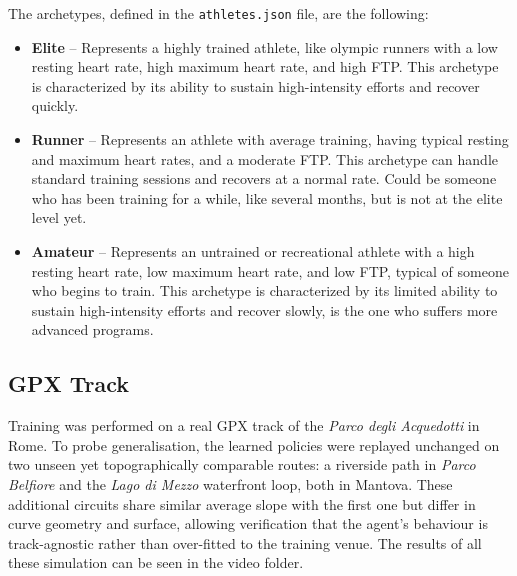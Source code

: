 The archetypes, defined in the \texttt{athletes.json} file, are the following:
\begin{itemize}
  \item \textbf{Elite} – Represents a highly trained athlete, like olympic runners with a low resting heart rate, high maximum heart rate, and high FTP. This archetype is characterized by its ability to sustain high-intensity efforts and recover quickly.
  \item \textbf{Runner} – Represents an athlete with average training, having typical resting and maximum heart rates, and a moderate FTP. This archetype can handle standard training sessions and recovers at a normal rate. Could be someone who has been training for a while, like several months, but is not at the elite level yet.
  \item \textbf{Amateur} – Represents an untrained or recreational athlete with a high resting heart rate, low maximum heart rate, and low FTP, typical of someone who begins to train. This archetype is characterized by its limited ability to sustain high-intensity efforts and recover slowly, is the one who suffers more advanced programs.
\end{itemize}

\subsection{GPX Track}\label{sec:gpx-track}
Training was performed on a real GPX track of the \textit{Parco degli Acquedotti} in Rome. To probe generalisation, the learned policies were replayed unchanged on two unseen yet topographically comparable routes: a riverside path in \textit{Parco Belfiore} and the \textit{Lago di Mezzo} waterfront loop, both in Mantova. These additional circuits share similar average slope with the first one but differ in curve geometry and surface, allowing verification that the agent’s behaviour is track-agnostic rather than over-fitted to the training venue. The results of all these simulation can be seen in the video folder.

